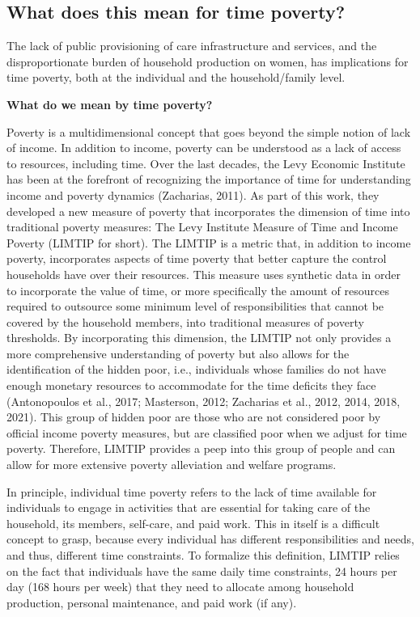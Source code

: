 \documentclass[
  11pt,
]{article}
\begin{document}
\subsection{What does this mean for time
poverty?}\label{what-does-this-mean-for-time-poverty}

The lack of public provisioning of care infrastructure and services, and
the disproportionate burden of household production on women, has
implications for time poverty, both at the individual and the
household/family level.

\textbf{What do we mean by time poverty?}

Poverty is a multidimensional concept that goes beyond the simple notion
of lack of income. In addition to income, poverty can be understood as a
lack of access to resources, including time. Over the last decades, the
Levy Economic Institute has been at the forefront of recognizing the
importance of time for understanding income and poverty dynamics
(Zacharias, 2011). As part of this work, they developed a new measure of
poverty that incorporates the dimension of time into traditional poverty
measures: The Levy Institute Measure of Time and Income Poverty (LIMTIP
for short). The LIMTIP is a metric that, in addition to income poverty,
incorporates aspects of time poverty that better capture the control
households have over their resources. This measure uses synthetic data
in order to incorporate the value of time, or more specifically the
amount of resources required to outsource some minimum level of
responsibilities that cannot be covered by the household members, into
traditional measures of poverty thresholds. By incorporating this
dimension, the LIMTIP not only provides a more comprehensive
understanding of poverty but also allows for the identification of the
hidden poor, i.e., individuals whose families do not have enough
monetary resources to accommodate for the time deficits they face
(Antonopoulos et al., 2017; Masterson, 2012; Zacharias et al., 2012,
2014, 2018, 2021). This group of hidden poor are those who are not
considered poor by official income poverty measures, but are classified
poor when we adjust for time poverty. Therefore, LIMTIP provides a peep
into this group of people and can allow for more extensive poverty
alleviation and welfare programs.

In principle, individual time poverty refers to the lack of time
available for individuals to engage in activities that are essential for
taking care of the household, its members, self-care, and paid work.
This in itself is a difficult concept to grasp, because every individual
has different responsibilities and needs, and thus, different time
constraints. To formalize this definition, LIMTIP relies on the fact
that individuals have the same daily time constraints, 24 hours per day
(168 hours per week) that they need to allocate among household
production, personal maintenance, and paid work (if any).
\end{document}
